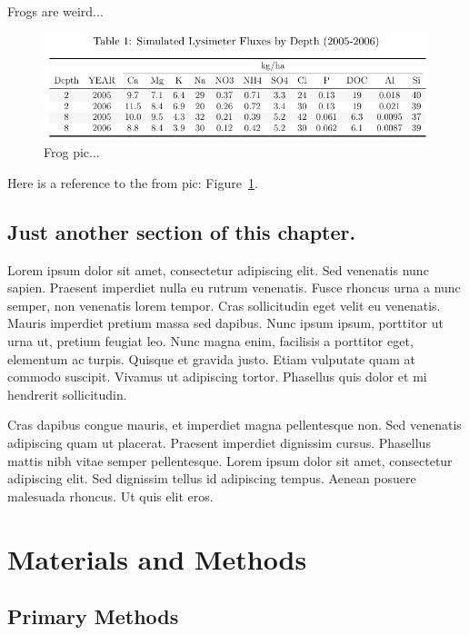 \documentclass[double,12pt]{beavtex}
\begin{document}
Frogs are weird...

\begin{figure}[ht!]
\begin{center}
	\includegraphics[width=20cm]{Images/LN_SED/Base/test.pdf}
	\caption{Frog pic...}
	\label{fig:frog}
	\end{center}
\end{figure}


Here is a reference to the from pic: Figure~\ref{fig:frog}.

\section{Just another section of this chapter.}

Lorem ipsum dolor sit amet, consectetur adipiscing elit. Sed venenatis nunc sapien. Praesent imperdiet nulla eu rutrum venenatis. Fusce rhoncus urna a nunc semper, non venenatis lorem tempor. Cras sollicitudin eget velit eu venenatis. Mauris imperdiet pretium massa sed dapibus. Nunc ipsum ipsum, porttitor ut urna ut, pretium feugiat leo. Nunc magna enim, facilisis a porttitor eget, elementum ac turpis. Quisque et gravida justo. Etiam vulputate quam at commodo suscipit. Vivamus ut adipiscing tortor. Phasellus quis dolor et mi hendrerit sollicitudin. 

Cras dapibus congue mauris, et imperdiet magna pellentesque non. Sed venenatis adipiscing quam ut placerat. Praesent imperdiet dignissim cursus. Phasellus mattis nibh vitae semper pellentesque. Lorem ipsum dolor sit amet, consectetur adipiscing elit. Sed dignissim tellus id adipiscing tempus. Aenean posuere malesuada rhoncus. Ut quis elit eros.




\chapter{Materials and Methods}

\section{Primary Methods}
\end{document}
